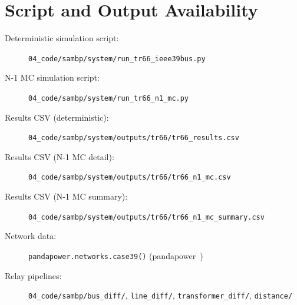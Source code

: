 \documentclass[12pt,a4paper]{article}
\begin{document}
\appendix
\section{Script and Output Availability}
\label{app:code}

\begin{description}
  \item[Deterministic simulation script:]
    \texttt{04\_code/sambp/system/run\_tr66\_ieee39bus.py}
  \item[N-1 MC simulation script:]
    \texttt{04\_code/sambp/system/run\_tr66\_n1\_mc.py}
  \item[Results CSV (deterministic):]
    \texttt{04\_code/sambp/system/outputs/tr66/tr66\_results.csv}
  \item[Results CSV (N-1 MC detail):]
    \texttt{04\_code/sambp/system/outputs/tr66/tr66\_n1\_mc.csv}
  \item[Results CSV (N-1 MC summary):]
    \texttt{04\_code/sambp/system/outputs/tr66/tr66\_n1\_mc\_summary.csv}
  \item[Network data:]
    \texttt{pandapower.networks.case39()} (pandapower~\citep{pandapower})
  \item[Relay pipelines:]
    \texttt{04\_code/sambp/bus\_diff/}, \texttt{line\_diff/},
    \texttt{transformer\_diff/}, \texttt{distance/}
\end{description}


\end{document}
